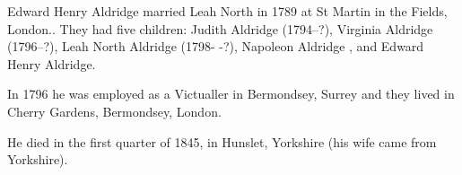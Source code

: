
Edward Henry Aldridge married Leah North  in 1789 at St Martin in the Fields, London.\cite{EHAldridgeMarriage}. They had five children: Judith Aldridge (1794--?), Virginia Aldridge (1796--?), Leah North Aldridge (1798- -?), Napoleon Aldridge , and Edward Henry Aldridge.

In 1796 he was employed as a Victualler in Bermondsey, Surrey and they lived in Cherry Gardens, Bermondsey, London. \cite{EHAldridgeWork}

He died in the first quarter of 1845, in Hunslet, Yorkshire (his wife came from Yorkshire).\cite{EHAldridgeDeath}

